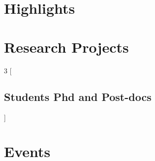\documentclass[11pt,fleqn]{book} %
\begin{document}
\chapter{Highlights}
\newpage



\chapter{Research Projects}
\newpage



\newpage
\begin{multicols}{3}
[
    \section*{Students Phd and Post-docs}
]
\end{multicols}



\chapter{Events}
\newpage




%
%
\end{document}
